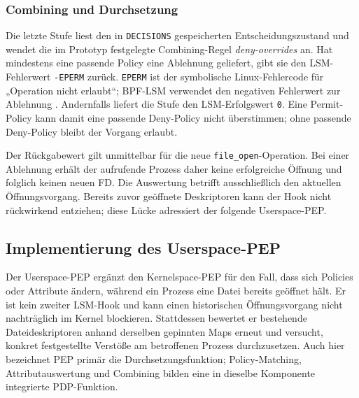 \subsubsection{Combining und Durchsetzung}
Die letzte Stufe liest den in \texttt{DECISIONS} gespeicherten Entscheidungszustand und wendet die im Prototyp festgelegte Combining-Regel \emph{deny-overrides} an. Hat mindestens eine passende Policy eine Ablehnung geliefert, gibt sie den LSM-Fehlerwert \texttt{-EPERM} zurück. \texttt{EPERM} ist der symbolische Linux-Fehlercode für „Operation nicht erlaubt“; BPF-LSM verwendet den negativen Fehlerwert zur Ablehnung \citep{kernelBpfLsm,manErrno}. Andernfalls liefert die Stufe den LSM-Erfolgswert \texttt{0}. Eine Permit-Policy kann damit eine passende Deny-Policy nicht überstimmen; ohne passende Deny-Policy bleibt der Vorgang erlaubt.

Der Rückgabewert gilt unmittelbar für die neue \texttt{file\_open}-Operation. Bei einer Ablehnung erhält der aufrufende Prozess daher keine erfolgreiche Öffnung und folglich keinen neuen FD. Die Auswertung betrifft ausschließlich den aktuellen Öffnungsvorgang. Bereits zuvor geöffnete Deskriptoren kann der Hook nicht rückwirkend entziehen; diese Lücke adressiert der folgende Userspace-PEP.

\subsection{Implementierung des Userspace-PEP}\label{sec:userspace-pep}
Der Userspace-PEP ergänzt den Kernelspace-PEP für den Fall, dass sich Policies oder Attribute ändern, während ein Prozess eine Datei bereits geöffnet hält.
Er ist kein zweiter LSM-Hook und kann einen historischen Öffnungsvorgang nicht nachträglich im Kernel blockieren.
Stattdessen bewertet er bestehende Dateideskriptoren anhand derselben gepinnten Maps erneut und versucht, konkret festgestellte Verstöße am betroffenen Prozess durchzusetzen.
Auch hier bezeichnet PEP primär die Durchsetzungsfunktion; Policy-Matching, Attributauswertung und Combining bilden eine in dieselbe Komponente integrierte PDP-Funktion.

